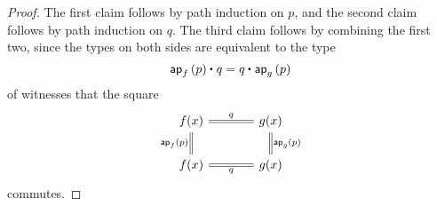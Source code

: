 \begin{proof}
The first claim follows by path induction on $p$, and the second claim follows by path induction on $q$. The third claim follows by combining the first two, since the types on both sides are equivalent to the type
\begin{equation*}
\ct{\ap{f}{p}}{q}=\ct{q}{\ap{g}{p}}
\end{equation*}
of witnesses that the square
\begin{equation*}
\begin{tikzcd}[column sep=large]
f(x) \arrow[r,equals,"q"] \arrow[d,swap,equals,"\ap{f}{p}"] & g(x) \arrow[d,equals,"\ap{g}{p}"] \\
f(x) \arrow[r,equals,swap,"q"] & g(x)
\end{tikzcd}
\end{equation*}
commutes.
\end{proof}

